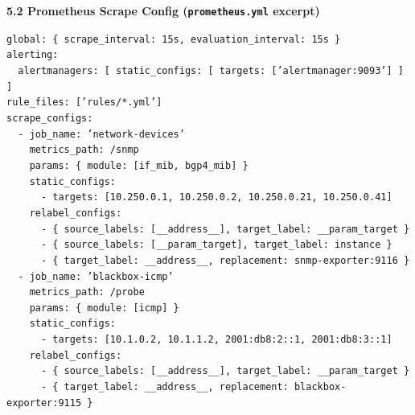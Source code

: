 \documentclass[11pt]{article}
\begin{document}
\begin{exoresolu}
\medskip
\textbf{5.2 Prometheus Scrape Config (\texttt{prometheus.yml} excerpt)}\par
\texttt{global: \{ scrape\_interval: 15s, evaluation\_interval: 15s \}}\\
\texttt{alerting:}\\
\texttt{\ \ alertmanagers: [ static\_configs: [ targets: ['alertmanager:9093'] ] ]}\\
\texttt{rule\_files: ['rules/*.yml']}\\
\texttt{scrape\_configs:}\\
\texttt{\ \ - job\_name: 'network-devices'}\\
\texttt{\ \ \ \ metrics\_path: /snmp}\\
\texttt{\ \ \ \ params: \{ module: [if\_mib, bgp4\_mib] \}}\\
\texttt{\ \ \ \ static\_configs:}\\
\texttt{\ \ \ \ \ \ - targets: [10.250.0.1, 10.250.0.2, 10.250.0.21, 10.250.0.41]}\\
\texttt{\ \ \ \ relabel\_configs:}\\
\texttt{\ \ \ \ \ \ - \{ source\_labels: [\_\_address\_\_], target\_label: \_\_param\_target \}}\\
\texttt{\ \ \ \ \ \ - \{ source\_labels: [\_\_param\_target], target\_label: instance \}}\\
\texttt{\ \ \ \ \ \ - \{ target\_label: \_\_address\_\_, replacement: snmp-exporter:9116 \}}\\
\texttt{\ \ - job\_name: 'blackbox-icmp'}\\
\texttt{\ \ \ \ metrics\_path: /probe}\\
\texttt{\ \ \ \ params: \{ module: [icmp] \}}\\
\texttt{\ \ \ \ static\_configs:}\\
\texttt{\ \ \ \ \ \ - targets: [10.1.0.2, 10.1.1.2, 2001:db8:2::1, 2001:db8:3::1]}\\
\texttt{\ \ \ \ relabel\_configs:}\\
\texttt{\ \ \ \ \ \ - \{ source\_labels: [\_\_address\_\_], target\_label: \_\_param\_target \}}\\
\texttt{\ \ \ \ \ \ - \{ target\_label: \_\_address\_\_, replacement: blackbox-exporter:9115 \}}


\end{exoresolu}
\end{document}
